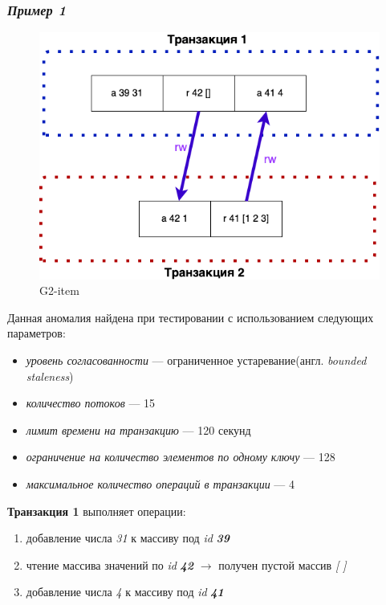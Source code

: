 \documentclass[12pt,  openany]{book}
\begin{document}
\subsubsection{\textit{Пример 1}}
\begin{figure}[H]
  \includegraphics[width=\textwidth]{images/g2item1.png}
  \caption{G2-item}
\end{figure}

\par
Данная аномалия найдена при тестировании с использованием следующих параметров: 
\begin{itemize}
\item[] \textit{уровень согласованности} --- ограниченное устаревание(англ.  \textit{bounded staleness})
\item[] \textit{количество потоков} --- 15
\item[] \textit{лимит времени на транзакцию} --- 120 секунд
\item[] \textit{ограничение на количество элементов по одному ключу} --- 128
\item[] \textit{максимальное количество операций в транзакции} --- 4
\end{itemize}

\textbf{Транзакция 1} выполняет операции:
\begin{enumerate}
\item добавление числа \textit{31} к массиву под \textit{id} \textit{\textbf{39}}
\item чтение массива значений по \textit{id} \textit{\textbf{42}} $\rightarrow$ получен пустой массив \textit{[ ]}
\item добавление числа \textit{4} к массиву под \textit{id} \textit{\textbf{41}}
\end{enumerate}
\end{document}
